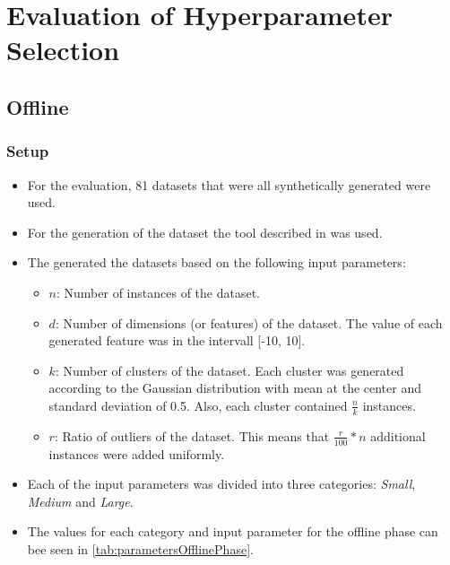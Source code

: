 \chapter{Evaluation of Hyperparameter Selection}

\section{Offline}

\subsection{Setup}

\begin{itemize}
    \item For the evaluation, 81 datasets that were all synthetically generated were used.
    \item For the generation of the dataset the tool described in \cite{Fritz2019InitializingAnalysis} was used. 
    \item The generated the datasets based on the following input parameters:
    \begin{itemize}
        \item $n$: Number of instances of the dataset.
        \item $d$: Number of dimensions (or features) of the dataset.
        The value of each generated feature was in the intervall [-10, 10].
        \item $k$: Number of clusters of the dataset. Each cluster was generated according to the Gaussian distribution with mean at the center and standard deviation of 0.5.
        Also, each cluster contained $\frac{n}{k}$ instances.
        \item $r$: Ratio of outliers of the dataset. This means that $\frac{r}{100} \ast n$ additional instances were added uniformly.
    \end{itemize}
    \item Each of the input parameters was divided into three categories: \textit{Small}, \textit{Medium} and \textit{Large}.
    \item The values for each category and input parameter for the offline phase can bee seen in \cref{tab:parametersOfflinePhase}.
    

\end{itemize}

